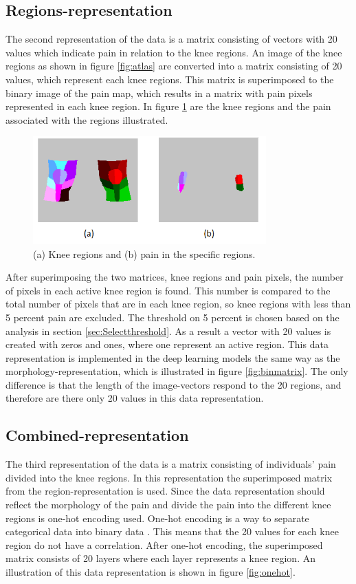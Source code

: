 \subsection{Regions-representation}
The second representation of the data is a matrix consisting of vectors with 20 values which indicate pain in relation to the knee regions.
An image of the knee regions as shown in figure \ref{fig:atlas} are converted into a matrix consisting of 20 values, which represent each knee regions. This matrix is superimposed to the binary image of the pain map, which results in a matrix with pain pixels represented in each knee region. In figure \ref{fig:binregions} are the knee regions and the pain associated with the regions illustrated.

\begin{figure} [H]
\centering
\includegraphics[width=0.8\textwidth]{figures/binregions}
\caption{(a) Knee regions and (b) pain in the specific regions.}
\label{fig:binregions}
\end{figure}

\noindent
After superimposing the two matrices, knee regions and pain pixels, the number of pixels in each active knee region is found. This number is compared to the total number of pixels that are in each knee region, so knee regions with less than 5 percent pain are excluded. The threshold on 5 percent is chosen based on the analysis in section \ref{sec:Selectthreshold}. As a result a vector with 20 values is created with zeros and ones, where one represent an active region. This data representation is implemented in the deep learning models the same way as the morphology-representation, which is illustrated in figure \ref{fig:binmatrix}. The only difference is that the length of the image-vectors respond to the 20 regions, and therefore are there only 20 values in this data representation.


\subsection{Combined-representation}
The third representation of the data is a matrix consisting of individuals’ pain divided into the knee regions.
\noindent
In this representation the superimposed matrix from the region-representation is used. Since the data representation should reflect the morphology of the pain and divide the pain into the different knee regions is one-hot encoding used. One-hot encoding is a way to separate categorical data into binary data \citep{Harris2012}. This means that the 20 values for each knee region do not have a correlation. After one-hot encoding, the superimposed matrix consists of 20 layers where each layer represents a knee region. An illustration of this data representation is shown in figure \ref{fig:onehot}.


